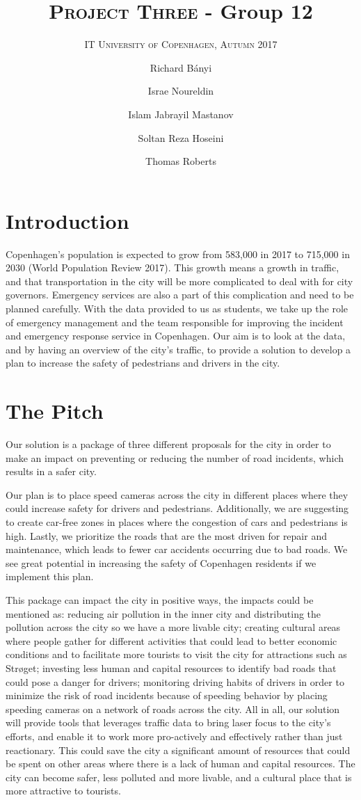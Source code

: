 \documentclass[format=acmsmall, review=false, screen=true]{acmart}
\author{Richard Bányi}
\author{Israe Noureldin}
\author{Islam Jabrayil Mastanov}
\author{Soltan Reza Hoseini}
\author{Thomas Roberts}
\title{\textsc{Project Three} - Group 12}
\subtitle{\textsc{IT University of Copenhagen, Autumn 2017}}
\begin{document}
\maketitle 

\section{Introduction}

Copenhagen’s population is expected to grow from 583,000 in 2017 to 715,000 in 2030 (World Population Review 2017). This growth means a growth in traffic, and that transportation in the city will be more complicated to deal with for city governors. Emergency services are also a part of this complication and need to be planned carefully. With the data provided to us as students, we take up the role of emergency management and the team responsible for improving the incident and emergency response service in Copenhagen. Our aim is to look at the data, and by having an overview of the city’s traffic, to provide a solution to develop a plan to increase the safety of pedestrians and drivers in the city.

\section{The Pitch}
Our solution is a package of three different proposals for the city in order to make an impact on preventing or reducing the number of road incidents, which results in a safer city.

Our plan is to place speed cameras across the city in different places where they could increase safety for drivers and pedestrians. Additionally, we are suggesting to create car-free zones in places where the congestion of cars and pedestrians is high. Lastly, we prioritize the roads that are the most driven for repair and maintenance, which leads to fewer car accidents occurring due to bad roads. We see great potential in increasing the safety of Copenhagen residents if we implement this plan.

This package can impact the city in positive ways, the impacts could be mentioned as: reducing air pollution in the inner city and distributing the pollution across the city so we have a more livable city; creating cultural areas where people gather for different activities that could lead to better economic conditions and to facilitate more tourists to visit the city for attractions such as Strøget; investing less human and capital resources to identify bad roads that could pose a danger for drivers; monitoring driving habits of drivers in order to minimize the risk of road incidents because of speeding behavior by placing speeding cameras on a network of roads across the city. All in all, our solution will provide tools that leverages traffic data to bring laser focus to the city’s efforts, and enable it to work more pro-actively and effectively rather than just reactionary. This could save the city a significant amount of resources that could be spent on other areas where there is a lack of human and capital resources. The city can become safer, less polluted and more livable, and a cultural place that is more attractive to tourists.
\end{document}
